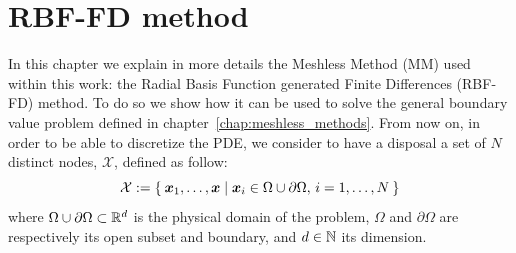 \chapter{RBF-FD method}


In this chapter we explain in more details the Meshless Method (MM) used within this work: the Radial Basis Function generated Finite Differences (RBF-FD) method.
To do so we show how it can be used to solve the general boundary value problem defined in chapter~\vref{chap:meshless_methods}.
From now on, in order to be able to discretize the PDE, we consider to have a disposal a set of $N$ distinct nodes, $\mathcal{X}$, defined as follow:
\begin{equation}
\label{eqn:generic_set_of_nodes_X}
	\mathcal{X} := \Set{\boldsymbol{x}_1, \dots, \boldsymbol{x} \mid \boldsymbol{x}_i \in \Omega\cup\partial\Omega, \, i=1, \dots, N}
\end{equation}
where $\Omega\cup\partial\Omega \subset \mathbb{R}^d$ is the physical domain of the problem, $\Omega$ and $\partial\Omega$ are respectively its open subset and boundary, and $d \in \mathbb{N}$ its dimension.


%
%

